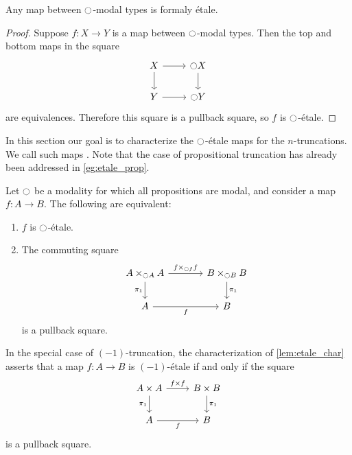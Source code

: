 \documentclass[9pt,twosided]{amsart}
\begin{document}
\begin{lem}\label{lem:etale_modal}
Any map between ${\ocircle}$-modal types is formaly \'etale.
\end{lem}

\begin{proof}
Suppose $f:X\to Y$ is a map between ${\ocircle}$-modal types. Then the top and bottom maps in the square
\begin{equation*}
\begin{tikzcd}
X \arrow[r] \arrow[d] & \modal X \arrow[d] \\
Y \arrow[r] & \modal Y
\end{tikzcd}
\end{equation*}
are equivalences. Therefore this square is a pullback square, so $f$ is ${\ocircle}$-\'etale.
\end{proof}

In this section our goal is to characterize the ${\ocircle}$-\'etale maps for the $n$-truncations. We call such maps . Note that the case of propositional truncation has already been addressed in \cref{eg:etale_prop}.

\begin{lem}\label{lem:etale_char}
Let ${\ocircle}$ be a modality for which all propositions are modal, and consider a map $f:A\to B$. The following are equivalent:
\begin{enumerate}
\item $f$ is ${\ocircle}$-\'etale.
\item The commuting square
\begin{equation*}
\begin{tikzcd}[column sep=large]
A\times_{\modal A} A \arrow[d,swap,"\pi_1"] \arrow[r,"{f\times_{\modal f} f}"] & B\times_{\modal B} B \arrow[d,"\pi_1"] \\
A \arrow[r,swap,"f"] & B
\end{tikzcd}
\end{equation*}
is a pullback square.
\end{enumerate}
\end{lem}

\begin{rmk}
In the special case of $(-1)$-truncation, the characterization of \cref{lem:etale_char} asserts that a map $f:A\to B$ is $(-1)$-\'etale if and only if the square
\begin{equation*}
\begin{tikzcd}
A\times A \arrow[d,swap,"\pi_1"] \arrow[r,"{f\times f}"] & B\times B \arrow[d,"\pi_1"] \\
A \arrow[r,swap,"f"] & B
\end{tikzcd}
\end{equation*}
is a pullback square.
\end{rmk}
\end{document}

